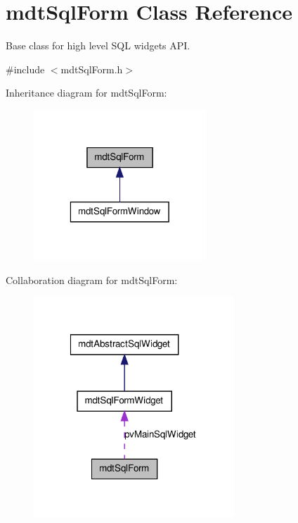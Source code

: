 \hypertarget{classmdt_sql_form}{
\section{mdtSqlForm Class Reference}
\label{classmdt_sql_form}
}


Base class for high level SQL widgets API.  




{\ttfamily \#include $<$mdtSqlForm.h$>$}



Inheritance diagram for mdtSqlForm:
\nopagebreak
\begin{figure}[H]
\begin{center}
\leavevmode
\includegraphics[width=184pt]{classmdt_sql_form__inherit__graph}
\end{center}
\end{figure}


Collaboration diagram for mdtSqlForm:
\nopagebreak
\begin{figure}[H]
\begin{center}
\leavevmode
\includegraphics[width=214pt]{classmdt_sql_form__coll__graph}
\end{center}
\end{figure}

